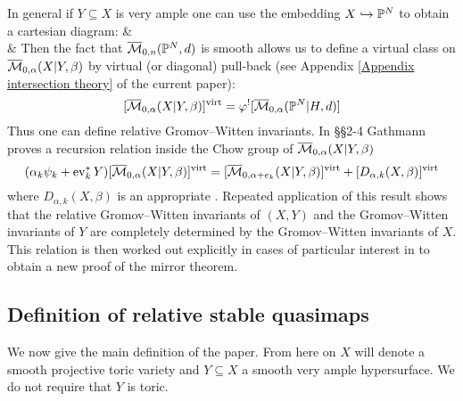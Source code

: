 In general if $Y \subseteq X$ is very ample one can use the embedding $X \hookrightarrow \mathbb P^N$ to obtain a cartesian diagram:
\bcd
{} \ar[r] \ar[d]  &  \ar[d] \\
 \ar[r,"\varphi"] & 
\ecd
Then the fact that $\overline{\mathcal M}_{0,n}(\mathbb P^N,d)$ is smooth allows us to define a virtual class on $\overline{\mathcal M}_{0,\alpha}(X|Y,\beta)$ by virtual (or diagonal) pull-back (see Appendix \ref{Appendix intersection theory} of the current paper):
\begin{equation*} [\overline{\mathcal M}_{0,\alpha}(X|Y,\beta)]^{\operatorname{virt}} = \varphi^! [\overline{\mathcal M}_{0,\alpha}(\mathbb P^N|H,d)] \end{equation*}
Thus one can define relative Gromov--Witten invariants. In \S\S 2-4 Gathmann proves a recursion relation inside the Chow group of $\overline{\mathcal M}_{0,\alpha}(X|Y,\beta)$
\begin{equation*} (\alpha_k \psi_k + \operatorname{ev}_k^* Y) [\overline{\mathcal M}_{0,\alpha}(X|Y,\beta)]^{\operatorname{virt}} = [\overline{\mathcal M}_{0,\alpha+e_k}(X|Y,\beta)]^{\operatorname{virt}} + [D_{\alpha,k}(X,\beta)]^{\operatorname{virt}} \end{equation*}
where $D_{\alpha,k}(X,\beta)$ is an appropriate . Repeated application of this result shows that the relative Gromov--Witten invariants of $(X,Y)$ and the Gromov--Witten invariants of $Y$ are completely determined by the Gromov--Witten invariants of $X$. This relation is then worked out explicitly in cases of particular interest in \cite{Ga-MF} to obtain a new proof of the mirror theorem.

\subsection{Definition of relative stable quasimaps} \label{Subsection relative stable quasimaps}

We now give the main definition of the paper. From here on $X$ will denote a smooth projective toric variety and $Y \subseteq X$ a smooth very ample hypersurface. We do not require that $Y$ is toric.

